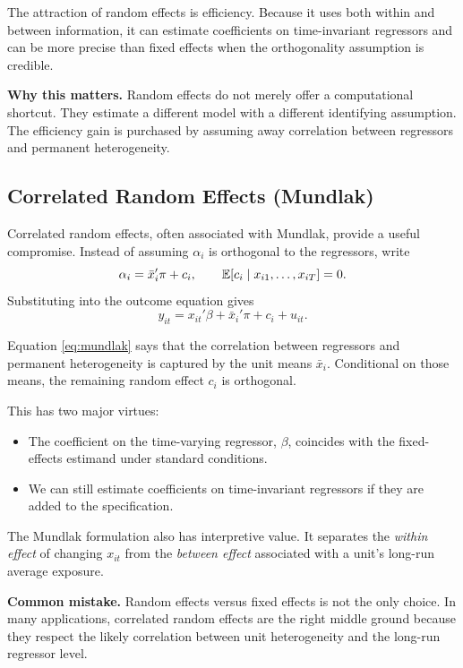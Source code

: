 The attraction of random effects is efficiency. Because it uses both within and between information, it can estimate coefficients on time-invariant regressors and can be more precise than fixed effects when the orthogonality assumption is credible.

\begin{boxD}
\textbf{Why this matters.}
Random effects do not merely offer a computational shortcut. They estimate a different model with a different identifying assumption. The efficiency gain is purchased by assuming away correlation between regressors and permanent heterogeneity.
\end{boxD}

\subsection{Correlated Random Effects (Mundlak)}
Correlated random effects, often associated with Mundlak, provide a useful compromise. Instead of assuming $\alpha_i$ is orthogonal to the regressors, write
\begin{equation}
\alpha_i = \bar{x}_i'\pi + c_i,
\qquad
\mathbb{E}[c_i \mid x_{i1},\dots,x_{iT}] = 0.
\label{eq:mundlak_decomp}
\end{equation}
Substituting into the outcome equation gives
\begin{equation}
y_{it} = x_{it}'\beta + \bar{x}_i'\pi + c_i + u_{it}.
\label{eq:mundlak}
\end{equation}

Equation \eqref{eq:mundlak} says that the correlation between regressors and permanent heterogeneity is captured by the unit means $\bar{x}_i$. Conditional on those means, the remaining random effect $c_i$ is orthogonal.

This has two major virtues:
\begin{itemize}
\item The coefficient on the time-varying regressor, $\beta$, coincides with the fixed-effects estimand under standard conditions.
\item We can still estimate coefficients on time-invariant regressors if they are added to the specification.
\end{itemize}

The Mundlak formulation also has interpretive value. It separates the \emph{within effect} of changing $x_{it}$ from the \emph{between effect} associated with a unit's long-run average exposure.

\begin{boxF}
\textbf{Common mistake.}
Random effects versus fixed effects is not the only choice. In many applications, correlated random effects are the right middle ground because they respect the likely correlation between unit heterogeneity and the long-run regressor level.
\end{boxF}

